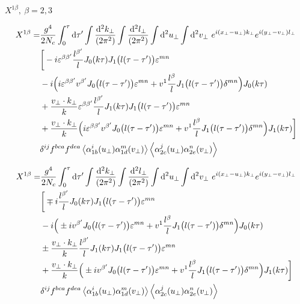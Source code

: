 \newpage

$X^{1 \beta}, ~ \beta=2,3$

\begin{equation*}
\begin{split}
 X^{1 \beta} = &
\frac{g^4}{2 N_c}
\int_0^\tau \mathop{}\!\mathrm{d} \tau'
\int \frac{\mathop{}\!\mathrm{d}^2 k_\perp}{(2\pi^2)}
\int \frac{\mathop{}\!\mathrm{d}^2 l_\perp}{(2\pi^2)}
\int \mathop{}\!\mathrm{d}^2 u_\perp
\int \mathop{}\!\mathrm{d}^2 v_\perp ~
e^{i (x_\perp - u_\perp) k_\perp}
e^{i (y_\perp - v_\perp) l_\perp} \\
& \bigg[ - i \varepsilon^{\beta \beta'} \frac{l^{\beta'}}{l} J_0(k \tau) J_1\big(l (\tau-\tau')\big) \varepsilon^{mn}  \\
& - i \Big(i \varepsilon^{\beta \beta'} v^{\beta'} J_0\big(l(\tau-\tau')\big) \varepsilon^{mn} + v^1 \frac{l^\beta}{l} J_1\big(l(\tau-\tau') \big) \delta^{mn} \Big) J_0(k \tau)  \\
& + \frac{v_\perp \cdot k_\perp}{k} \varepsilon^{\beta \beta'} \frac{l^{\beta'}}{l} J_1(k\tau) J_1\big(l(\tau-\tau')\big) \varepsilon^{mn}  \\
& + \frac{v_\perp \cdot k_\perp}{k} \Big( i \varepsilon^{\beta \beta'} v^{\beta'} J_0\big(l(\tau-\tau')\big) \varepsilon^{mn} + v^1 \frac{l^\beta}{l} J_1\big(l(\tau-\tau') \big) \delta^{mn} \Big) J_1 (k\tau) \bigg]\\
& \delta^{ij}  f^{bca} f^{dea}
\left< \alpha^i_{1b} (u_\perp) \alpha^m_{1d} (v_\perp) \right>  \left< \alpha^j_{2c} (u_\perp) \alpha^n_{2e} (v_\perp) \right>
\end{split}
\end{equation*}

\begin{equation*}
\begin{split}
 X^{1 \beta} = &
\frac{g^4}{2 N_c}
\int_0^\tau \mathop{}\!\mathrm{d} \tau'
\int \frac{\mathop{}\!\mathrm{d}^2 k_\perp}{(2\pi^2)}
\int \frac{\mathop{}\!\mathrm{d}^2 l_\perp}{(2\pi^2)}
\int \mathop{}\!\mathrm{d}^2 u_\perp
\int \mathop{}\!\mathrm{d}^2 v_\perp ~
e^{i (x_\perp - u_\perp) k_\perp}
e^{i (y_\perp - v_\perp) l_\perp} \\
& \bigg[ \mp i  \frac{l^{\beta'}}{l} J_0(k \tau) J_1\big(l (\tau-\tau')\big) \varepsilon^{mn}  \\
& - i \Big( \pm i  v^{\beta'} J_0\big(l(\tau-\tau')\big) \varepsilon^{mn} + v^1 \frac{l^\beta}{l} J_1\big(l(\tau-\tau') \big) \delta^{mn} \Big) J_0(k \tau) \\
& \pm \frac{v_\perp \cdot k_\perp}{k}  \frac{l^{\beta'}}{l} J_1(k\tau) J_1\big(l(\tau-\tau')\big) \varepsilon^{mn}  \\
& + \frac{v_\perp \cdot k_\perp}{k} \Big( \pm i v^{\beta'} J_0\big(l(\tau-\tau')\big) \varepsilon^{mn} + v^1 \frac{l^\beta}{l} J_1\big(l(\tau-\tau') \big) \delta^{mn} \Big) J_1 (k\tau) \bigg]\\
& \delta^{ij} f^{bca} f^{dea}
\left< \alpha^i_{1b} (u_\perp) \alpha^m_{1d} (v_\perp) \right>  \left< \alpha^j_{2c} (u_\perp) \alpha^n_{2e} (v_\perp) \right>
\end{split}
\end{equation*}


